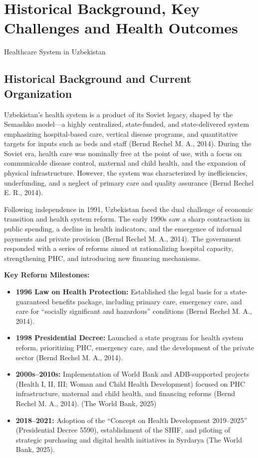 \chapter{Historical Background, Key Challenges and Health Outcomes}

Healthcare System in Uzbekistan

\section{Historical Background and Current Organization}\label{historical-background-and-current-organization}

Uzbekistan's health system is a product of its Soviet legacy, shaped by
the Semashko model---a highly centralized, state-funded, and
state-delivered system emphasizing hospital-based care, vertical disease
programs, and quantitative targets for inputs such as beds and staff
(Bernd Rechel M. A., 2014). During the Soviet era, health care was
nominally free at the point of use, with a focus on communicable disease
control, maternal and child health, and the expansion of physical
infrastructure. However, the system was characterized by inefficiencies,
underfunding, and a neglect of primary care and quality assurance (Bernd
Rechel E. R., 2014).

Following independence in 1991, Uzbekistan faced the dual challenge of
economic transition and health system reform. The early 1990s saw a
sharp contraction in public spending, a decline in health indicators,
and the emergence of informal payments and private provision (Bernd
Rechel M. A., 2014). The government responded with a series of reforms
aimed at rationalizing hospital capacity, strengthening PHC, and
introducing new financing mechanisms.

\textbf{Key Reform Milestones:}

\begin{itemize}
\item
  \textbf{1996 Law on Health Protection:} Established the legal basis
  for a state-guaranteed benefits package, including primary care,
  emergency care, and care for ``socially significant and hazardous''
  conditions (Bernd Rechel M. A., 2014).
\item
  \textbf{1998 Presidential Decree:} Launched a state program for health
  system reform, prioritizing PHC, emergency care, and the development
  of the private sector (Bernd Rechel M. A., 2014).
\item
  \textbf{2000s--2010s:} Implementation of World Bank and ADB-supported
  projects (Health I, II, III; Woman and Child Health Development)
  focused on PHC infrastructure, maternal and child health, and
  financing reforms (Bernd Rechel M. A., 2014). (The World Bank, 2025)
\item
  \textbf{2018--2021:} Adoption of the ``Concept on Health Development
  2019--2025'' (Presidential Decree 5590), establishment of the SHIF,
  and piloting of strategic purchasing and digital health initiatives in
  Syrdarya (The World Bank, 2025).
\end{itemize}

